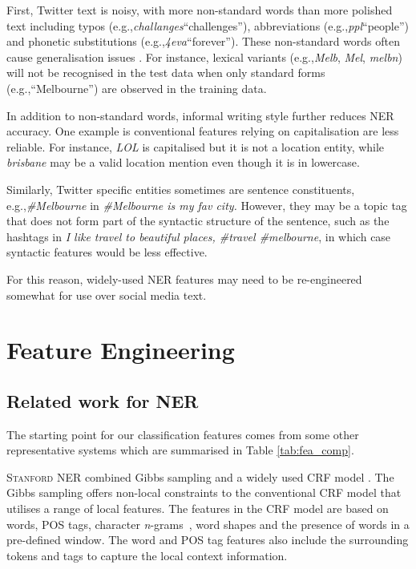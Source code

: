 \documentclass[11pt]{article}
\newcommand{\eg}{e.g.,\xspace}
\newcommand{\mygl}[1]{``#1''}
\newcommand{\myex}[1]{\textit{#1}}
\newcommand{\lexpair}[2]{\myex{#1}\xspace\mygl{#2}}
\newcommand{\ngrams}{\textit{n}-grams\ }
\newcommand{\stanford}{\textsc{Stanford}\xspace}
\newcommand{\tabref}[2][]{Table#1 \ref{#2}}
\begin{document}
First, Twitter text is noisy, with more non-standard words than more polished text \cite{baldwin2013} including typos (\eg \lexpair{challanges}{challenges}), abbreviations (\eg \lexpair{ppl}{people}) and phonetic substitutions (\eg \lexpair{4eva}{forever}).
These non-standard words often cause generalisation issues \cite{acl11han}.
For instance, lexical variants (\eg \myex{Melb}, \myex{Mel}, \myex{melbn}) will not be recognised in the test data when only standard forms (\eg \mygl{Melbourne}) are observed in the training data.

In addition to non-standard words, informal writing style further reduces NER accuracy.
One example is conventional features relying on capitalisation are less reliable.
For instance, \myex{LOL} is capitalised but it is not a location entity, while \myex{brisbane} may be a valid location mention even though it is in lowercase.

Similarly, Twitter specific entities sometimes are sentence constituents, \eg \myex{\#Melbourne} in \myex{\#Melbourne is my fav city.}
However, they may be a topic tag that does not form part of the syntactic structure of the sentence, such as the hashtags in \myex{I like travel to beautiful places, \#travel \#melbourne}, in which case syntactic features would be less effective.

For this reason, widely-used NER features may need to be re-engineered somewhat for use over social media text.

\section{Feature Engineering}
\label{sec:feature}

\subsection{Related work for NER}
\label{sec:literature}
The starting point for our classification features comes from some other representative systems which are summarised in \tabref{tab:fea_comp}.

\stanford NER combined Gibbs sampling and a widely used CRF model \cite{acl05fink}.
The Gibbs sampling offers non-local constraints to the conventional CRF model that utilises a range of local features.
The features in the CRF model are based on words, POS tags, character \ngrams, word shapes and the presence of words in a pre-defined window.
The word and POS tag features also include the surrounding tokens and tags to capture the local context information.
\end{document}
